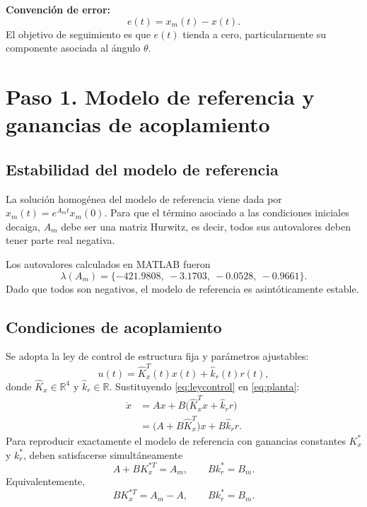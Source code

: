 \documentclass[conference,letterpaper]{IEEEtran}
\begin{document}
\textbf{Convención de error:}
\begin{equation}\label{eq:error}
    e(t)=x_m(t)-x(t).
\end{equation}
El objetivo de seguimiento es que $e(t)$ tienda a cero, particularmente su componente asociada al ángulo $\theta$.

\section{Paso 1. Modelo de referencia y ganancias de acoplamiento}
\subsection{Estabilidad del modelo de referencia}
La solución homogénea del modelo de referencia viene dada por $x_m(t)=e^{A_mt}x_m(0)$. Para que el término asociado a las condiciones iniciales decaiga, $A_m$ debe ser una matriz Hurwitz, es decir, todos sus autovalores deben tener parte real negativa.

Los autovalores calculados en MATLAB fueron
\begin{equation}\label{eq:eigAm}
    \lambda(A_m)=\{-421.9808,\ -3.1703,\ -0.0528,\ -0.9661\}.
\end{equation}
Dado que todos son negativos, el modelo de referencia es asintóticamente estable.

\subsection{Condiciones de acoplamiento}
Se adopta la ley de control de estructura fija y parámetros ajustables:
\begin{equation}\label{eq:leycontrol}
    u(t)=\hat K_x^T(t)x(t)+\hat k_r(t)r(t),
\end{equation}
donde $\hat K_x\in\mathbb R^4$ y $\hat k_r\in\mathbb R$. Sustituyendo \eqref{eq:leycontrol} en \eqref{eq:planta}:
\begin{align}
    \dot x &= Ax+B\big(\hat K_x^T x+\hat k_r r\big)\\
           &=\big(A+B\hat K_x^T\big)x+B\hat k_r r.
\end{align}
Para reproducir exactamente el modelo de referencia con ganancias constantes $K_x^*$ y $k_r^*$, deben satisfacerse simultáneamente
\begin{equation}\label{eq:matching}
    \boxed{A+BK_x^{*T}=A_m,\qquad Bk_r^*=B_m.}
\end{equation}
Equivalentemente,
\begin{equation}
    BK_x^{*T}=A_m-A,\qquad Bk_r^*=B_m.
\end{equation}
\end{document}
